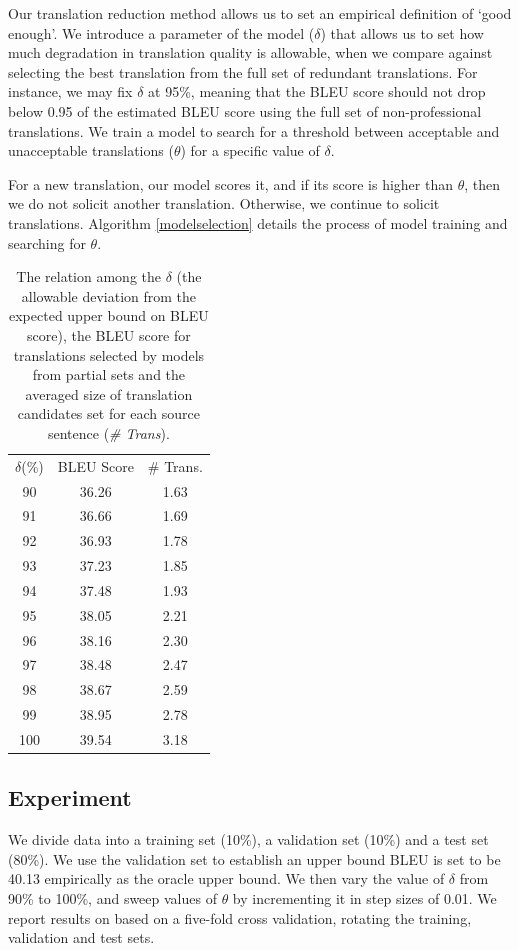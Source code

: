 \documentclass[11pt,letterpaper]{article}
\begin{document}
Our translation reduction method allows us to set an empirical definition of `good enough'.  We introduce a parameter  of the model  ($\delta$) that allows us to set how much degradation in translation quality is allowable, when we compare against selecting the best translation from the full set of redundant translations.  For instance, we may fix $\delta$ at 95\%, meaning that the BLEU score should not drop below 0.95 of the estimated BLEU score using the full set of non-professional translations.   We train a model to search for a threshold between acceptable and unacceptable translations ($\theta$) for a specific value of $\delta$. 

For a new translation, our model scores it, and if its score is higher than $\theta$, then we do not solicit another translation. Otherwise, we continue to solicit translations.  Algorithm \ref{modelselection} details the process of model training and searching for $\theta$. 


 \begin{table}
 \center
\begin{tabular}{c|c|c}
\hline
$\delta$(\%) & BLEU Score & \# Trans. \\ \hhline{===}
90    & 36.26      & 1.63            \\
91    & 36.66      & 1.69             \\
92    & 36.93      & 1.78             \\
93    & 37.23      & 1.85             \\
94    & 37.48      & 1.93             \\
95    & 38.05      & 2.21             \\
96    & 38.16      & 2.30             \\
97    & 38.48      & 2.47             \\
98    & 38.67      & 2.59             \\
99    & 38.95      & 2.78             \\
100   & 39.54      & 3.18             \\ \hline
\end{tabular}
\caption{The relation among the $\delta$ (the allowable deviation from the expected upper bound on BLEU score), the BLEU score for translations selected by models from partial sets and the averaged size of translation candidates set for each source sentence (\textit{\# Trans}).  }
    \label{orderanother}
\end{table}


\subsection{Experiment}
 We divide data into a training set (10\%), a validation set (10\%) and a test set (80\%). 
We use the validation set to establish an upper bound BLEU is set to be 40.13 empirically as the oracle upper bound. 
We then vary the value of $\delta$ from 90\% to 100\%, and sweep values of $\theta$ by incrementing it in step sizes of 0.01.
We report results on based on a five-fold cross validation, rotating the training, validation and test sets.
\end{document}
